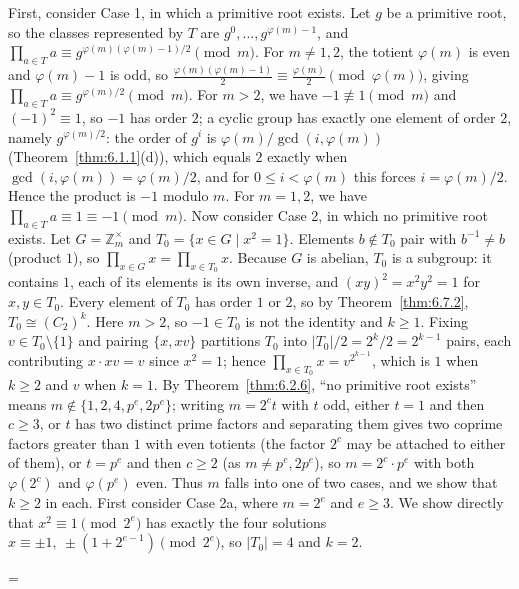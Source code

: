 \documentclass[11pt]{article}
\makeatletter
\theoremstyle{ntstyle}
\let\nt@closedisplay\]
\def\nt@guardedclose{\@ifnextchar\par{\nt@closeafterpar}{\@ifnextchar\end{\postdisplaypenalty\@M\nt@closedisplay}{\nt@closedisplay}}}
\def\nt@closeafterpar\par{\@ifnextchar\par{\nt@closeafterpar}{\@ifnextchar\end{\postdisplaypenalty\@M\nt@closedisplay\par}{\nt@closedisplay\par}}}
\renewenvironment{proof}[1][\proofname]{\par
  \pushQED{\qed}\normalfont\topsep\medskipamount\edef\nt@afterproof{\@endparpenalty=\the\@endparpenalty\relax}\@beginparpenalty\@M\@endparpenalty\@M\let\]\nt@guardedclose\trivlist\item[]\textit{#1\@addpunct{.}} \ignorespaces}{\ifvmode\addpenalty\@M\fi\popQED\nt@afterproof\endtrivlist\@endpefalse}
\newcommand{\ZmodUnits}[1]{\mathbb{Z}_{#1}^{\times}}
\makeatother
\begin{document}
\begin{proof} First, consider Case 1, in which a primitive root exists.
	Let $g$ be a primitive root, so the classes represented by $T$ are $g^{0}, \ldots,
		g^{\varphi(m)-1}$, and $\prod_{a \in T} a \equiv
		g^{\varphi(m)(\varphi(m)-1)/2} \pmod{m}$. For $m \neq 1, 2$,
	the totient $\varphi(m)$ is even and $\varphi(m)-1$ is odd, so
	$\frac{\varphi(m)(\varphi(m)-1)}{2} \equiv \frac{\varphi(m)}{2}
		\pmod{\varphi(m)}$, giving $\prod_{a \in T}a\equiv g^{\varphi(m)/2}\pmod{m}$. For $m>2$, we have $-1\not\equiv1\pmod{m}$ and $(-1)^2\equiv1$, so $-1$ has order $2$; a cyclic group has exactly one element of order $2$, namely $g^{\varphi(m)/2}$: the order of $g^{i}$ is $\varphi(m)/\gcd(i,\varphi(m))$ (Theorem~\ref{thm:6.1.1}(d)), which equals $2$ exactly when $\gcd(i,\varphi(m))=\varphi(m)/2$, and for $0\le i<\varphi(m)$ this forces $i=\varphi(m)/2$. Hence the product is $-1$ modulo $m$. For $m = 1, 2$,
	we have $\prod_{a \in T} a \equiv 1 \equiv -1 \pmod{m}$. Now consider Case 2, in which no
	primitive root exists. Let $G = \ZmodUnits{m}$ and $T_0 = \{x \in
		G \mid x^{2} = 1\}$. Elements $b \notin T_0$ pair with $b^{-1} \neq b$
	(product $1$), so $\prod_{x \in G} x = \prod_{x \in T_0} x$. Because $G$
	is abelian, $T_0$ is a subgroup: it contains $1$, each of its elements is
	its own inverse, and $(xy)^2=x^2y^2=1$ for $x,y\in T_0$. Every element
	of $T_0$ has order $1$ or $2$, so by
	Theorem~\ref{thm:6.7.2}, $T_0 \cong (C_2)^{k}$. Here $m>2$, so $-1\in T_0$ is not the identity and $k\ge1$. Fixing $v \in T_0 \setminus
		\{1\}$ and pairing $\{x, xv\}$ partitions $T_0$ into
		$|T_0|/2 = 2^{k}/2 = 2^{k-1}$ pairs, each contributing
	$x\cdot xv = v$ since $x^{2} = 1$; hence $\prod_{x \in T_0} x =
		v^{2^{k-1}}$, which is $1$ when $k \ge 2$ and $v$ when $k = 1$. By
	Theorem~\ref{thm:6.2.6}, ``no primitive root exists'' means $m \notin \{1, 2,
		4, p^{e}, 2p^{e}\}$; writing $m = 2^{c} t$ with $t$ odd, either $t = 1$
	and then $c \ge 3$, or $t$ has two distinct prime factors and
	separating them gives two coprime factors greater than $1$ with even totients
	(the factor $2^{c}$ may be attached to either of them), or $t = p^{e}$ and then $c \ge 2$
	(as $m \neq p^{e}, 2p^{e}$), so $m = 2^{c} \cdot p^{e}$ with both
	$\varphi(2^{c})$ and $\varphi(p^{e})$ even. Thus $m$ falls into one of
	two cases, and we show that $k \ge 2$ in each. First consider Case 2a, where $m = 2^{e}$ and $e \ge 3$. We show directly that $x^{2}
		\equiv 1 \pmod{2^{e}}$ has exactly the four solutions $x \equiv \pm
			1,\ \pm(1 + 2^{e-1}) \pmod{2^{e}}$, so $|T_0| = 4$ and $k = 2$.

\end{proof}
\end{document}

